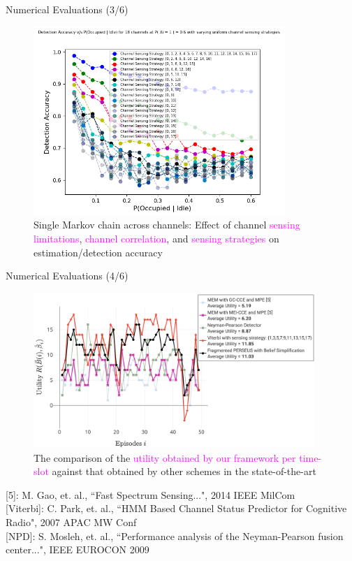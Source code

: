 \documentclass{beamer}
\begin{document}
\begin{frame}{Numerical Evaluations (3/6)}
    \begin{figure}
    \centering
    \includegraphics[width = 0.85\textwidth]{Uniform_Channel_Sensing.png}
    \caption{Single Markov chain across channels: Effect of channel \textcolor{magenta}{sensing limitations}, \textcolor{magenta}{channel correlation}, and \textcolor{magenta}{sensing strategies} on estimation/detection accuracy}
    \label{fig:32}
\end{figure}
\end{frame}
\begin{frame}{Numerical Evaluations (4/6)}
    \begin{figure}
    \centering
    \includegraphics[width = 0.95\textwidth]{PerformanceEvaluation.png}
    \caption{The comparison of the \textcolor{magenta}{utility obtained by our framework per time-slot} against that obtained by other schemes in the state-of-the-art}
    \label{fig:33}
\end{figure}
\tiny{[5]: M. Gao, et. al., ``Fast Spectrum Sensing...", 2014 IEEE MilCom}
\\\tiny{[Viterbi]: C. Park, et. al., ``HMM Based Channel Status Predictor for Cognitive Radio", 2007 APAC MW Conf}
\\\tiny{[NPD]: S. Mosleh, et. al., ``Performance analysis of the Neyman-Pearson fusion center...", IEEE EUROCON 2009}
\end{frame}
\end{document}

